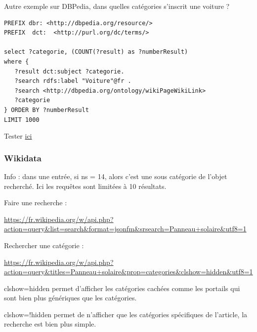 \fi

Autre exemple sur DBPedia, dans quelles catégories s'inscrit une voiture ?

\begin{lstlisting}[language=SPARQL, backgroundcolor=\color{lightgray}]
PREFIX dbr: <http://dbpedia.org/resource/>
PREFIX  dct:  <http://purl.org/dc/terms/> 

select ?categorie, (COUNT(?result) as ?numberResult) 
where {
   ?result dct:subject ?categorie.
   ?search rdfs:label "Voiture"@fr .
   ?search <http://dbpedia.org/ontology/wikiPageWikiLink> 
   ?categorie
} ORDER BY ?numberResult
LIMIT 1000
\end{lstlisting}

Tester \href{http://fr.dbpedia.org/sparql?default-graph-uri=&query=PREFIX+dbr\%3A+\%3Chttp\%3A\%2F\%2Fdbpedia.org\%2Fresource\%2F\%3E\%0D\%0APREFIX++dct\%3A++\%3Chttp\%3A\%2F\%2Fpurl.org\%2Fdc\%2Fterms\%2F\%3E+\%0D\%0A\%0D\%0Aselect+\%3Fcategorie\%2C+\%28COUNT\%28\%3Fresult\%29+as+\%3FnumberResult\%29+\%0D\%0Awhere+\%7B\%0D\%0A+++\%3Fresult+dct\%3Asubject+\%3Fcategorie.\%0D\%0A+++\%3Fsearch+rdfs\%3Alabel+\%22Voiture\%22\%40fr+.\%0D\%0A+++\%3Fsearch+\%3Chttp\%3A\%2F\%2Fdbpedia.org\%2Fontology\%2FwikiPageWikiLink\%3E+\%0D\%0A+++\%3Fcategorie\%0D\%0A\%7D+ORDER+BY+\%3FnumberResult\%0D\%0ALIMIT+1000&format=text\%2Fhtml&timeout=0&debug=on}{ici}

\subsubsection{Wikidata}


Info : dans une entrée, si ns = 14, alors c'est une sous catégorie de l'objet recherché. Ici les requêtes sont limitées à 10 résultats.

Faire une recherche : 

\url{https://fr.wikipedia.org/w/api.php?action=query&list=search&format=jsonfm&srsearch=Panneau+solaire&utf8=1}

Rechercher une catégorie :

\url{https://fr.wikipedia.org/w/api.php?action=query&titles=Panneau+solaire&prop=categories&clshow=hidden&utf8=1}

clshow=hidden permet d'afficher les catégories cachées comme les portails qui sont bien plus génériques que les catégories.

clshow=!hidden permet de n'afficher que les catégories spécifiques de l'article, la recherche est bien plus simple.

